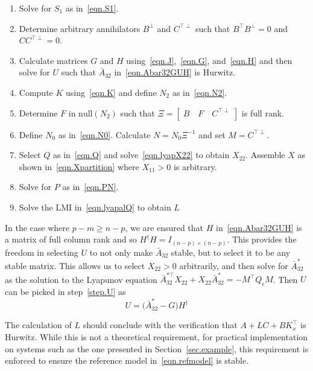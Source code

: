 \documentclass[]{../sty/aiaa-tc}
\begin{document}
  \begin{enumerate}
    \setlength{\itemsep}{0pt}
    \item{Solve for $S_{1}$ as in\ \eqref{eqn.S1}.}
    \item{Determine arbitrary annihilators $B^{\perp}$ and $C^{\top\perp}$ such that $B^{\top}B^{\perp}=0$ and $CC^{\top\perp}=0$.}
    \item{\label{step.U}Calculate matrices $G$ and $H$ using\ \eqref{eqn.J},\ \eqref{eqn.G}, and\ \eqref{eqn.H} and then solve for $U$ such that $\bar{A}_{32}$ in\ \eqref{eqn.Abar32GUH} is Hurwitz.}
    \item{Compute $K$ using\ \eqref{eqn.K} and define $N_{2}$ as in\ \eqref{eqn.N2}.}
    \item{Determine $F$ in $\text{null}(N_{2})$ such that $\Xi=[\;B \quad F \quad C^{\top\perp} \;]$ is full rank.}
    \item{Define $N_{0}$ as in\ \eqref{eqn.N0}. Calculate $N=N_{0}\Xi^{-1}$ and set $M=C^{\top\perp}$.}
    \item{\label{step.X11}Select $Q$ as in\ \eqref{eqn.Q} and solve\ \eqref{eqn.lyapX22} to obtain $X_{22}$. Assemble $X$ as shown in\ \eqref{eqn.Xpartition} where $X_{11}>0$ is arbitrary.}
    \item{Solve for $P$ as in\ \eqref{eqn.PN}.}
    \item{Solve the LMI in\ \eqref{eqn.lyapalQ} to obtain $L$}
  \end{enumerate}

  \begin{rem-dan}\label{rem.pmgeqnp}
    In the case where $p-m\geq n-p$, we are ensured that $H$ in\ \eqref{eqn.Abar32GUH} is a matrix of full column rank and so $H^{\dagger}H=I_{(n-p)\times(n-p)}$.
    This provides the freedom in selecting $U$ to not only make $\bar{A}_{32}$ stable, but to select it to be any stable matrix.
    This allows us to select $X_{22}>0$ arbitrarily, and then solve for $\bar{A}_{32}^{*}$ as the solution to the Lyapunov equation $\bar{A}_{32}^{*\top}X_{22}+X_{22}\bar{A}_{32}^{*}=-M^{\top}Q_{\epsilon}M$.
    Then $U$ can be picked in step~\ref{step.U} as
    \begin{equation}
      \label{eqn.Uremark}
      U=\bigr(\bar{A}_{32}^{*}-G\bigr)H^{\dagger}
    \end{equation}
  \end{rem-dan}

  \begin{rem-dan}
    The calculation of $L$ should conclude with the verification that $A+LC+BK_{x}^{\top}$ is Hurwitz.
    While this is not a theoretical requirement, for practical implementation on systems such as the one presented in Section~\ref{sec.example}, this requirement is enforced to ensure the reference model in\ \eqref{eqn.refmodel} is stable.
  \end{rem-dan}
\end{document}
